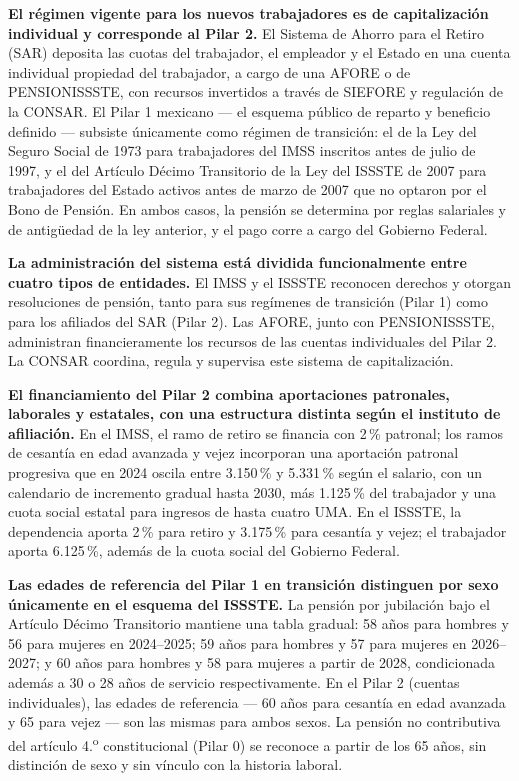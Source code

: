 \documentclass[12pt, letterpaper]{article}
\begin{document}
\textbf{El régimen vigente para los nuevos trabajadores es de capitalización individual y corresponde al Pilar 2.} El Sistema de Ahorro para el Retiro (SAR) deposita las cuotas del trabajador, el empleador y el Estado en una cuenta individual propiedad del trabajador, a cargo de una AFORE o de PENSIONISSSTE, con recursos invertidos a través de SIEFORE y regulación de la CONSAR. El Pilar 1 mexicano --- el esquema público de reparto y beneficio definido --- subsiste únicamente como régimen de transición: el de la Ley del Seguro Social de 1973 para trabajadores del IMSS inscritos antes de julio de 1997, y el del Artículo Décimo Transitorio de la Ley del ISSSTE de 2007 para trabajadores del Estado activos antes de marzo de 2007 que no optaron por el Bono de Pensión. En ambos casos, la pensión se determina por reglas salariales y de antigüedad de la ley anterior, y el pago corre a cargo del Gobierno Federal.

\textbf{La administración del sistema está dividida funcionalmente entre cuatro tipos de entidades.} El IMSS y el ISSSTE reconocen derechos y otorgan resoluciones de pensión, tanto para sus regímenes de transición (Pilar 1) como para los afiliados del SAR (Pilar 2). Las AFORE, junto con PENSIONISSSTE, administran financieramente los recursos de las cuentas individuales del Pilar 2. La CONSAR coordina, regula y supervisa este sistema de capitalización.

\textbf{El financiamiento del Pilar 2 combina aportaciones patronales, laborales y estatales, con una estructura distinta según el instituto de afiliación.} En el IMSS, el ramo de retiro se financia con 2\,\% patronal; los ramos de cesantía en edad avanzada y vejez incorporan una aportación patronal progresiva que en 2024 oscila entre 3.150\,\% y 5.331\,\% según el salario, con un calendario de incremento gradual hasta 2030, más 1.125\,\% del trabajador y una cuota social estatal para ingresos de hasta cuatro UMA. En el ISSSTE, la dependencia aporta 2\,\% para retiro y 3.175\,\% para cesantía y vejez; el trabajador aporta 6.125\,\%, además de la cuota social del Gobierno Federal.

\textbf{Las edades de referencia del Pilar 1 en transición distinguen por sexo únicamente en el esquema del ISSSTE.} La pensión por jubilación bajo el Artículo Décimo Transitorio mantiene una tabla gradual: 58 años para hombres y 56 para mujeres en 2024--2025; 59 años para hombres y 57 para mujeres en 2026--2027; y 60 años para hombres y 58 para mujeres a partir de 2028, condicionada además a 30 o 28 años de servicio respectivamente. En el Pilar 2 (cuentas individuales), las edades de referencia --- 60 años para cesantía en edad avanzada y 65 para vejez --- son las mismas para ambos sexos. La pensión no contributiva del artículo 4.\textsuperscript{o} constitucional (Pilar 0) se reconoce a partir de los 65 años, sin distinción de sexo y sin vínculo con la historia laboral.
\end{document}
